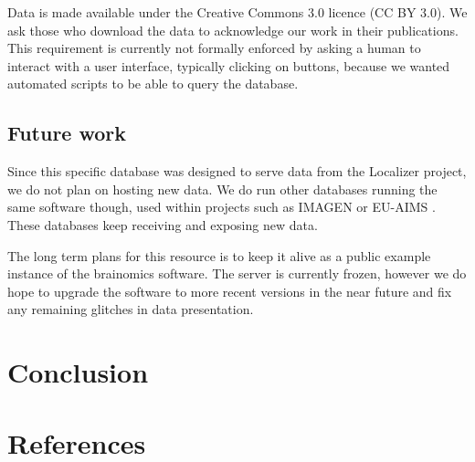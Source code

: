 \documentclass[review]{elsarticle}
\begin{document}
Data is made available under the Creative Commons 3.0 licence (CC BY 3.0).
We ask those who download the data to acknowledge our work in their publications.
This requirement is currently not formally enforced by asking a human to
interact with a user interface, typically clicking on buttons, because we
wanted automated scripts to be able to query the database.


\subsection{Future work}

Since this specific database was designed to serve data from the Localizer
project, we do not plan on hosting new data. We do run other databases
running the same software though, used within projects such as
IMAGEN \cite{Imagen2010} or EU-AIMS \cite{Aims2014}. These databases
keep receiving and exposing new data.

The long term plans for this resource is to keep it alive as a public
example instance of the {brainomics} software. The server is currently
frozen, however we do hope to upgrade the software to more recent versions
in the near future and fix any remaining glitches in data presentation.


\section{Conclusion}


\section*{References}


\end{document}
